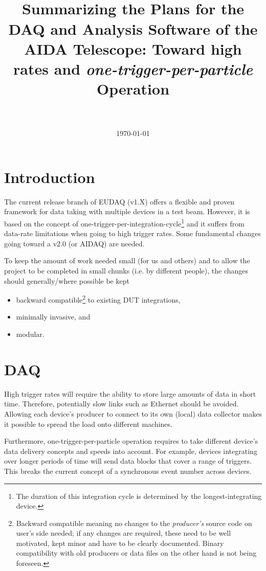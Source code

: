 \documentclass[paper=a4, fontsize=11pt]{scrartcl}	%
\title{
		\usefont{OT1}{bch}{b}{n}
		\horrule{0.5pt} \\[0.4cm]
		\huge Summarizing the Plans for the DAQ and
                Analysis Software of the AIDA Telescope: Toward high
                rates and
                \textit{one-trigger-per-particle} Operation\\
		\horrule{2pt} \\[0.5cm]
}
\author{}
\date{\today}
\numberwithin{equation}{section}		%
\numberwithin{figure}{section}			%
\numberwithin{table}{section}				%
\begin{document}
 

\maketitle
\section{Introduction}
The current release branch of EUDAQ (v1.X) offers a flexible and proven
framework for data taking with multiple devices in a test
beam. However, it is based on the concept of
one-trigger-per-integration-cycle\footnote{The duration of this
  integration cycle is determined by the longest-integrating device.}
and it suffers from data-rate limitations when going to high trigger
rates. Some fundamental changes going toward a v2.0 (or AIDAQ) are
needed.

To keep the amount of work needed small (for us and others) and to allow the project to
be completed in small chunks (i.e. by different people), the changes
should generally/where possible be kept
\begin{itemize}
\item backward compatible\footnote{Backward compatible meaning no
    changes to the \emph{producer's} source code on user's side needed; if any
    changes are required, these need to be well motivated, kept minor and
    have to be clearly documented. Binary compatibility with old producers or
    data files on the other hand is not being foreseen.} to existing DUT integrations,
\item minimally invasive, and
\item modular.
\end{itemize}

\section{DAQ}
\label{sec:daq}
High trigger rates will require the ability to store large amounts of
data in short time. Therefore, potentially slow links such as Ethernet
should be avoided. Allowing each device's producer to connect to its
own (local) data collector makes it possible to spread the load onto
different machines.

Furthermore, one-trigger-per-particle operation requires to take
different device's data delivery concepts and speeds into
account. For example, devices integrating over longer periods of time
will send data blocks that cover a range of triggers. This breaks the
current concept of a synchronous event number across devices.
\end{document}
